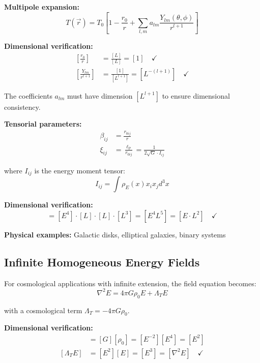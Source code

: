 \documentclass[12pt,a4paper]{report}
\newcommand{\lP}{\ell_{\text{P}}}         %
\newcommand{\rzero}{r_0}                  %
\begin{document}
\textbf{Multipole expansion:}
\begin{equation}
	T(\vec{r}) = T_0\left[1 - \frac{\rzero}{r} + \sum_{l,m} a_{lm} \frac{Y_{lm}(\theta,\phi)}{r^{l+1}}\right]
	\label{eq:multipole_expansion}
\end{equation}

\textbf{Dimensional verification:}
\begin{align}
	\left[\frac{\rzero}{r}\right] &= \frac{[L]}{[L]} = [1] \quad \checkmark \\
	\left[\frac{Y_{lm}}{r^{l+1}}\right] &= \frac{[1]}{[L^{l+1}]} = [L^{-(l+1)}] \quad \checkmark
\end{align}

The coefficients $a_{lm}$ must have dimension $[L^{l+1}]$ to ensure dimensional consistency.

\textbf{Tensorial parameters:}
\begin{align}
	\beta_{ij} &= \frac{r_{0ij}}{r} \\
	\xi_{ij} &= \frac{\lP}{r_{0ij}} = \frac{1}{2\sqrt{G} \cdot I_{ij}}
\end{align}

where $I_{ij}$ is the energy moment tensor:
\begin{equation}
	I_{ij} = \int \rho_E(x) x_i x_j d^3x
\end{equation}

\textbf{Dimensional verification:}
\begin{equation}
	[I_{ij}] = [E^4] \cdot [L] \cdot [L] \cdot [L^3] = [E^4 L^5] = [E \cdot L^2] \quad \checkmark
\end{equation}

\textbf{Physical examples:} Galactic disks, elliptical galaxies, binary systems

\subsection{Infinite Homogeneous Energy Fields}
\label{subsec:infinite_homogeneous}

For cosmological applications with infinite extension, the field equation becomes:
\begin{equation}
	\nabla^2 E = 4\pi G \rho_0 E + \Lambda_T E
\end{equation}

with a cosmological term $\Lambda_T = -4\pi G \rho_0$.

\textbf{Dimensional verification:}
\begin{align}
	[\Lambda_T] &= [G][\rho_0] = [E^{-2}][E^4] = [E^2] \\
	[\Lambda_T E] &= [E^2][E] = [E^3] = [\nabla^2 E] \quad \checkmark
\end{align}
\end{document}
